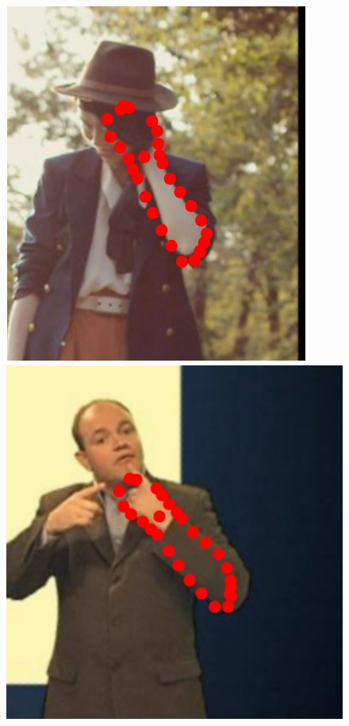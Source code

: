 \begin{figure}
    \includegraphics[height=\ofh]{resources/Annotation_Correction/Suplementory_Meterial/ExFit/0032}
    \hfill
    \includegraphics[height=\ofh]{resources/Annotation_Correction/Suplementory_Meterial/ExFit/0033}
    \hfill

\end{figure}
